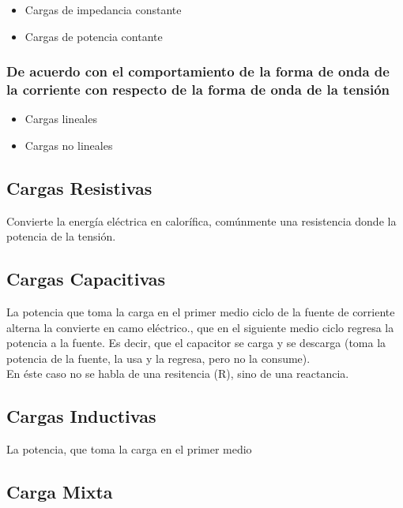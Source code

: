 \documentclass[]{article}
\begin{document}
\begin{itemize}
	\item Cargas de impedancia constante
	\item Cargas de potencia contante
\end{itemize}

\subsubsection{De acuerdo con el comportamiento de la forma de onda de la corriente con respecto de la forma de onda de la tensión}

\begin{itemize}
	\item Cargas lineales
	\item Cargas no lineales
\end{itemize}



\subsection{Cargas Resistivas}

Convierte la energía eléctrica en calorífica, comúnmente una resistencia donde la potencia de la tensión.\\

\subsection{Cargas Capacitivas}

La potencia que toma la carga en el primer medio ciclo de la fuente de corriente alterna la convierte en camo eléctrico., que en el siguiente medio ciclo regresa la potencia a la fuente. Es decir, que el capacitor se carga y se descarga (toma la potencia de la fuente, la usa y la regresa, pero no la consume).\\


En éste caso no se habla de una resitencia (R), sino de una reactancia.\\

\subsection{Cargas Inductivas}

La potencia, que toma la carga en el primer medio\\

\subsection{Carga Mixta}
\end{document}
